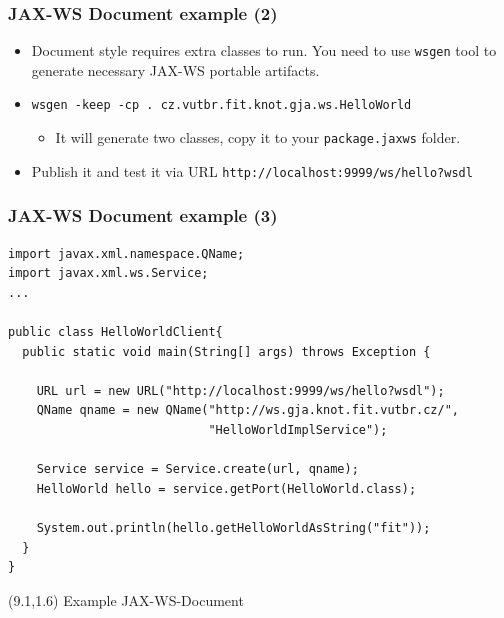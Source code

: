 \documentclass[10pt,xcolor=pdflatex]{beamer}
\begin{document}
\begin{frame}[containsverbatim]\frametitle{JAX-WS Document example (2)}
\begin{itemize}
  \item Document style requires extra classes to run. You need to use \texttt{wsgen} tool to generate necessary JAX-WS portable artifacts.
  \item[] \verb+wsgen -keep -cp . cz.vutbr.fit.knot.gja.ws.HelloWorld+
    \begin{itemize}
      \item It will generate two classes, copy it to your \texttt{package.jaxws} folder.
    \end{itemize}
  \item Publish it and test it via URL \verb+http://localhost:9999/ws/hello?wsdl+
\end{itemize}
\end{frame}


\begin{frame}[containsverbatim]\frametitle{JAX-WS Document example (3)}
\begin{footnotesize}
\begin{verbatim}
import javax.xml.namespace.QName;
import javax.xml.ws.Service;
...

public class HelloWorldClient{
  public static void main(String[] args) throws Exception {

    URL url = new URL("http://localhost:9999/ws/hello?wsdl");
    QName qname = new QName("http://ws.gja.knot.fit.vutbr.cz/",
                            "HelloWorldImplService");

    Service service = Service.create(url, qname);
    HelloWorld hello = service.getPort(HelloWorld.class);

    System.out.println(hello.getHelloWorldAsString("fit"));
  }
}
\end{verbatim}
\end{footnotesize}
\begin{textblock}{5}(9.1,1.6)
    {\footnotesize Example JAX-WS-Document}
\end{textblock}
\end{frame}
\end{document}
